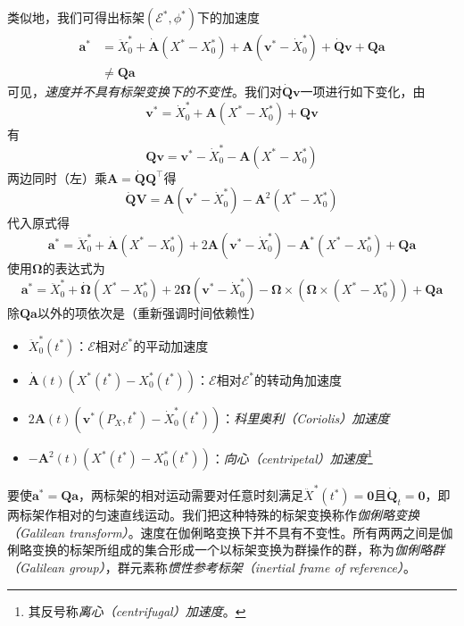 \documentclass[main.tex]{subfiles}
\begin{document}
类似地，我们可得出标架$\left(\mathcal{E}^*,\phi^*\right)$下的加速度
\begin{align*}
    \mathbf{a}^* & =\ddot{X}^*_0+\dot{\mathbf{A}}\left(X^*-X^*_0\right)+\mathbf{A}\left(\mathbf{v}^*-\dot{X}^*_0\right)+\dot{\mathbf{Q}}\mathbf{v}+\mathbf{Qa} \\
                 & \neq\mathbf{Qa}
\end{align*}
可见，\emph{速度并不具有标架变换下的不变性}。我们对$\dot{\mathbf{Q}}\mathbf{v}$一项进行如下变化，由
\[\mathbf{v}^*=\dot{X}^*_0+\mathbf{A}\left(X^*-X^*_0\right)+\mathbf{Qv}\]
有
\[\mathbf{Qv}=\mathbf{v}^*-\dot{X}^*_0-\mathbf{A}\left(X^*-X^*_0\right)\]
两边同时（左）乘$\mathbf{A}=\dot{\mathbf{Q}}\mathbf{Q}^\intercal$得
\[\dot{\mathbf{Q}}\mathbf{V}=\mathbf{A}\left(\mathbf{v}^*-\dot{X}^*_0\right)-\mathbf{A}^2\left(X^*-X^*_0\right)\]
代入原式得
\[\mathbf{a}^*=\ddot{X}_0^*+\dot{\mathbf{A}}\left(X^*-X^*_0\right)+2\mathbf{A}\left(\mathbf{v}^*-\dot{X}^*_0\right)-\mathbf{A}^*\left(X^*-X^*_0\right)+\mathbf{Qa}\]
使用$\boldsymbol{\Omega}$的表达式为
\[\mathbf{a}^*=\ddot{X}_0^*+\dot{\boldsymbol{\Omega}}\left(X^*-X^*_0\right)+2\boldsymbol{\Omega}\left(\mathbf{v}^*-\dot{X}_0^*\right)-\boldsymbol{\Omega}\times\left(\boldsymbol{\Omega}\times\left(X^*-X^*_0\right)\right)+\mathbf{Qa}\]
除$\mathbf{Qa}$以外的项依次是（重新强调时间依赖性）
\begin{itemize}
    \item $\ddot{X}_0^*\left(t^*\right)$：$\mathcal{E}$相对$\mathcal{E}^*$的平动加速度
    \item $\dot{\mathbf{A}}\left(t\right)\left(X^*\left(t^*\right)-X_0^*\left(t^*\right)\right)$：$\mathcal{E}$相对$\mathcal{E}^*$的转动角加速度
    \item $2\mathbf{A}\left(t\right)\left(\mathbf{v}^*\left(P_X,t^*\right)-\dot{X}_0^*\left(t^*\right)\right)$：\emph{科里奥利（Coriolis）加速度}
    \item $-\mathbf{A}^2\left(t\right)\left(X^*\left(t^*\right)-X^*_0\left(t^*\right)\right)$：\emph{向心（centripetal）加速度}\footnote{其反号称\emph{离心（centrifugal）加速度}。}
\end{itemize}
要使$\mathbf{a}^*=\mathbf{Qa}$，两标架的相对运动需要对任意时刻满足$\ddot{X}^*\left(t^*\right)=\mathbf{0}$且$\dot{\mathbf{Q}}_t=\mathbf{0}$，即两标架作相对的匀速直线运动。我们把这种特殊的标架变换称作\emph{伽俐略变换（Galilean transform）}。速度在伽俐略变换下并不具有不变性。所有两两之间是伽俐略变换的标架所组成的集合形成一个以标架变换为群操作的群，称为\emph{伽俐略群（Galilean group）}，群元素称\emph{惯性参考标架（inertial frame of reference）}。
\end{document}
